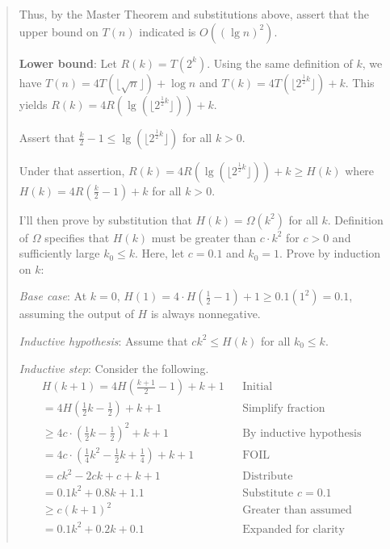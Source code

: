 \documentclass[11pt]{article}
\begin{document}
\begin{enumerate}[leftmargin=*]
\begin{enumerate}
\begin{enumerate}
\begin{quote}
          Thus, by the Master Theorem and substitutions above, assert that the upper bound on $T(n)$ indicated is $O((\lg n)^2)$. 

          \medskip
          \textbf{Lower bound}:
          Let $R(k) = T(2^k)$. Using the same definition of $k$, we have $T(n) = 4T(\lfloor \sqrt{n} \rfloor) + \log n$ and $T(k) = 4T(\lfloor 2^{\frac{1}{2}k} \rfloor) + k$. This yields $R(k) = 4R(\lg(\lfloor 2^{\frac{1}{2}k} \rfloor)) + k$.

          \medskip
          Assert that $\frac{k}{2} - 1 \leq \lg(\lfloor 2^{\frac{1}{2}k} \rfloor)$ for all $k > 0$. 

          \medskip
          Under that assertion, $R(k) = 4R(\lg(\lfloor 2^{\frac{1}{2}k} \rfloor)) + k \geq H(k)$ where $H(k) = 4R(\frac{k}{2} - 1) + k$ for all $k > 0$. 

        \medskip
      I'll then prove by substitution that $H(k) = \Omega(k^2)$ for all $k$. Definition of $\Omega$ specifies that $H(k)$ must be greater than $c \cdot k^2$ for $c > 0$ and sufficiently large $k_0 \leq k$. Here, let $c = 0.1$ and $k_0 = 1$. Prove by induction on $k$: 

        \medskip
        \textit{Base case}: At $k = 0$, $H(1) = 4 \cdot H(\frac{1}{2} - 1) + 1 \geq 0.1(1^2) = 0.1$, assuming the output of $H$ is always nonnegative.

        \medskip
        \textit{Inductive hypothesis}: Assume that $ck^2 \leq H(k)$ for all $k_0 \leq k$. 

        \medskip
        \textit{Inductive step}: Consider the following.
        \begin{align*}
            && H(k + 1) = 4H(\frac{k + 1}{2} - 1) + k + 1 && \text{Initial} && \\
            && = 4H(\frac{1}{2}k - \frac{1}{2}) + k + 1 && \text{Simplify fraction} && \\
            && \geq 4c \cdot (\frac{1}{2}k - \frac{1}{2})^2 + k + 1 && \text{By inductive hypothesis} && \\
            && = 4c \cdot (\frac{1}{4}k^2 - \frac{1}{2}k + \frac{1}{4}) + k + 1 && \text{FOIL} && \\
            && = ck^2 - 2ck + c + k + 1 && \text{Distribute} && \\
            && = 0.1k^2 + 0.8k + 1.1 && \text{Substitute $c = 0.1$} && \\
            && \geq c(k + 1)^2 && \text{Greater than assumed bound} && \\
            && = 0.1k^2 + 0.2k + 0.1 && \text{Expanded for clarity} && \\
        \end{align*} 


\end{quote}
\end{enumerate}
\end{enumerate}
\end{enumerate}
\end{document}
